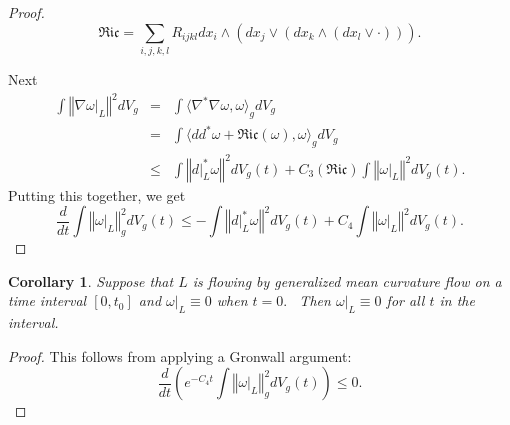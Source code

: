 \documentclass[12pt,letterpaper]{amsart}%
\newcounter{mycounter}
\numberwithin{mycounter}{section}
\theoremstyle{plain}
\newtheorem{corollary}[mycounter]{Corollary}
\numberwithin{equation}{section}
\theoremstyle{definition}
\begin{document}
\begin{proof}
\begin{equation*}
\mathfrak{Ric=}\sum_{i,j,k,l}R_{ijkl}dx_{i}\wedge (dx_{j}\vee (dx_{k}\wedge
(dx_{l}\vee \cdot ))).
\end{equation*}%

 
 Next
\begin{eqnarray*}
\int \left\Vert \nabla \omega |_{L}\right\Vert ^{2}dV_{g} &=&\int \langle
\nabla ^{\ast }\nabla \omega ,\omega \rangle _{g}dV_{g} \\
&=&\int \langle dd^{\ast }\omega +\mathfrak{Ric} (\omega) ,\omega \rangle _{g}dV_{g} \\
&\leq &\int \left\Vert d|_{L}^{\ast }\omega \right\Vert
^{2}dV_{g}(t)+C_{3}(\mathfrak{Ric})\int \left\Vert \omega |_{L}\right\Vert ^{2}dV_{g}(t).
\end{eqnarray*}%
Putting this together, we get 
\begin{equation*}
\frac{d}{dt}\int \left\Vert \omega |_{L}\right\Vert _{g}^{2}dV_{g}(t)\leq
-\int \left\Vert d|_{L}^{\ast }\omega \right\Vert ^{2}dV_{g}(t)+C_{4}\int
\left\Vert \omega |_{L}\right\Vert ^{2}dV_{g}(t).
\end{equation*}
\end{proof}





\begin{corollary}
Suppose that $L$ is flowing by generalized mean curvature flow on a
time interval $\left[ 0,t_{0}\right] $ and $\omega |_{L}\equiv 0$ when $t=0.$
\ Then $\omega |_{L}\equiv 0$ for all $t$ in the interval. \ 
\end{corollary}

\begin{proof}
This follows from applying a Gronwall argument: \begin{equation*}
\frac{d}{dt} \left(e^{-C_4 t}\int \left\Vert \omega |_{L}\right\Vert _{g}^{2}dV_{g}(t) \right)\leq
0.
\end{equation*} 
\end{proof}
\end{document}
